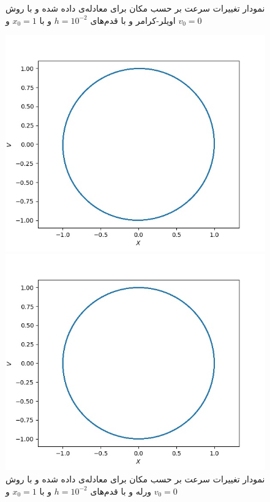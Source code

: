 \documentclass[11pt, a4paper]{article}
\begin{document}
\begin{figure}[h!]
\begin{minipage}[b]{0.4\textwidth}
    \caption{نمودار تغییرات سرعت بر حسب مکان برای معادله‌ی داده شده و با روش اویلر-کرامر و با قدم‌های $h = 10^{-2}$ و با $x_0 = 1$ و $v_0 = 0$}
    \label{fig:q2_euler_cromer}
  \end{minipage}
  \begin{minipage}[b]{0.4\textwidth}
    \includegraphics[width=\textwidth]{q2_v_x_Verlet Method_0_62.83185307179586_0.01_[1, 0].jpg}
    \caption{نمودار تغییرات سرعت بر حسب مکان برای معادله‌ی داده شده و با روش ورله و با قدم‌های $h = 10^{-2}$ و با $x_0 = 1$ و $v_0 = 0$}
    \label{fig:q2_verlet}
  \end{minipage}
  \hfill
  \begin{minipage}[b]{0.4\textwidth}
    \includegraphics[width=\textwidth]{q2_v_x_Velocity Verlet Method_0_62.83185307179586_0.01_[1, 0].jpg}

\end{minipage}
\end{figure}
\end{document}
